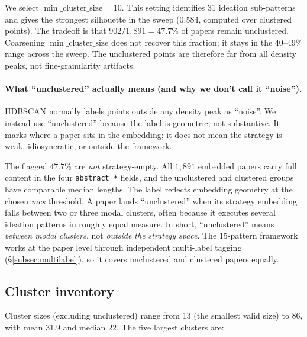 \documentclass[10pt,a4paper]{article}
\begin{document}
We select $\min\_\text{cluster\_size}{=}10$. This setting identifies 31 ideation sub-patterns and gives the strongest silhouette in the sweep ($0.584$, computed over clustered points). The tradeoff is that $902 / 1{,}891 = 47.7\%$ of papers remain unclustered. Coarsening $\min\_\text{cluster\_size}$ does not recover this fraction; it stays in the $40$--$49\%$ range across the sweep. The unclustered points are therefore far from all density peaks, not fine-granularity artifacts.

\paragraph{What ``unclustered'' actually means (and why we don't call it ``noise'').} HDBSCAN normally labels points outside any density peak as ``noise''. We instead use ``unclustered'' because the label is geometric, not substantive. It marks where a paper sits in the embedding; it does not mean the strategy is weak, idiosyncratic, or outside the framework.

The flagged $47.7\%$ are \emph{not} strategy-empty. All $1{,}891$ embedded papers carry full content in the four \texttt{abstract\_*} fields, and the unclustered and clustered groups have comparable median lengths. The label reflects embedding geometry at the chosen \textit{mcs} threshold. A paper lands ``unclustered'' when its strategy embedding falls between two or three modal clusters, often because it executes several ideation patterns in roughly equal measure. In short, ``unclustered'' means \emph{between modal clusters}, not \emph{outside the strategy space}. The 15-pattern framework works at the paper level through independent multi-label tagging (\S\ref{subsec:multilabel}), so it covers unclustered and clustered papers equally.

\subsection{Cluster inventory}

Cluster sizes (excluding unclustered) range from 13 (the smallest valid size) to 86, with mean 31.9 and median 22. The five largest clusters are:
\end{document}
